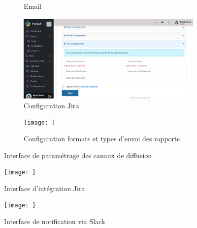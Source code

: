 \begin{justify}
\begin{enumerate}[label=\Alph*.]
\begin{figure}[H]
\begin{subfigure}[b]{0.5\linewidth}
                        \caption{Email}
                    \end{subfigure}
                    \hfill
                    \begin{subfigure}[b]{0.5\linewidth}
                        \centering
                        \includegraphics[width=\linewidth]{chapitres/ch3Sp1/section/sprint2/img/interface/cof-ira.PNG}
                        \caption{Configuration Jira}
                    \end{subfigure}
                    \hfill
                    \begin{subfigure}[b]{0.49\linewidth}
                        \centering
                        \texttt{[image: ]}
                        \caption{Configuration formats et types d'envoi des rapports}
                    \end{subfigure}
                    \caption{Interface de paramétrage des canaux de diffusion}
                    \label{fig:fig:interface_parametrage_canaux}
                \end{figure}
                
                    \begin{figure}[H]
                        \centering
                        \texttt{[image: ]}
                        \caption{Interface d’intégration Jira}
                        \label{fig:interface_jira_integration}
                    \end{figure}
                        
                    \begin{figure}[H]
                        \centering
                        \texttt{[image: ]}
                        \caption{Interface de notification via Slack}
                        \label{fig:interface_slack_notification}
                    \end{figure}
                        

\end{enumerate}
\end{justify}
